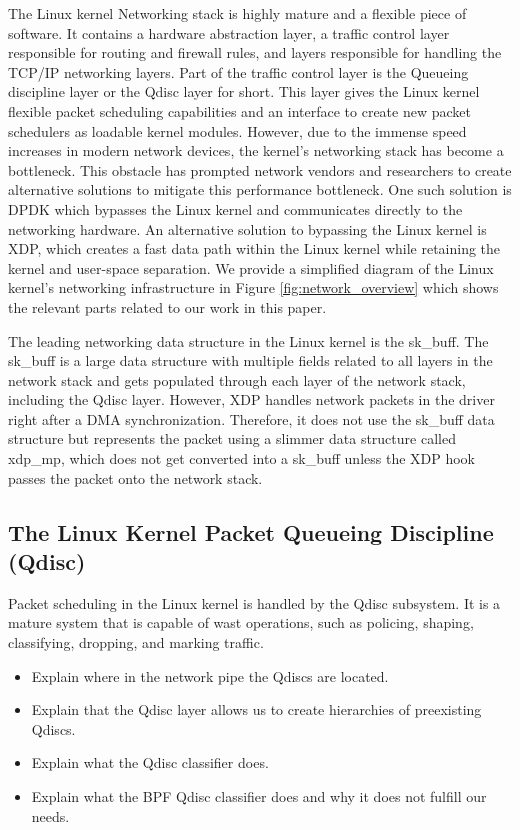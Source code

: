\documentclass[sigconf, nonacm]{acmart}
\begin{document}
The Linux kernel Networking stack is highly mature and a flexible piece of software. It contains a hardware abstraction layer, a traffic control layer responsible for routing and firewall rules, and layers responsible for handling the TCP/IP networking layers. Part of the traffic control layer is the Queueing discipline layer or the Qdisc layer for short. This layer gives the Linux kernel flexible packet scheduling capabilities and an interface to create new packet schedulers as loadable kernel modules. However, due to the immense speed increases in modern network devices, the kernel's networking stack has become a bottleneck. This obstacle has prompted network vendors and researchers to create alternative solutions to mitigate this performance bottleneck. One such solution is DPDK which bypasses the Linux kernel and communicates directly to the networking hardware. An alternative solution to bypassing the Linux kernel is XDP, which creates a fast data path within the Linux kernel while retaining the kernel and user-space separation. We provide a simplified diagram of the Linux kernel's networking infrastructure in Figure \ref{fig:network_overview} which shows the relevant parts related to our work in this paper.

The leading networking data structure in the Linux kernel is the sk\_buff. The sk\_buff is a large data structure with multiple fields related to all layers in the network stack and gets populated through each layer of the network stack, including the Qdisc layer. However, XDP handles network packets in the driver right after a DMA synchronization. Therefore, it does not use the sk\_buff data structure but represents the packet using a slimmer data structure called xdp\_mp, which does not get converted into a sk\_buff unless the XDP hook passes the packet onto the network stack.



\subsection{The Linux Kernel Packet Queueing Discipline (Qdisc)}

Packet scheduling in the Linux kernel is handled by the Qdisc subsystem. It is a mature system that is capable of wast operations, such as policing, shaping, classifying, dropping, and marking traffic.

\begin{itemize}
  \item Explain where in the network pipe the Qdiscs are located.
  \item Explain that the Qdisc layer allows us to create hierarchies of preexisting Qdiscs.
  \item Explain what the Qdisc classifier does.
  \item Explain what the BPF Qdisc classifier does and why it does not fulfill our needs.
\end{itemize}
\end{document}
